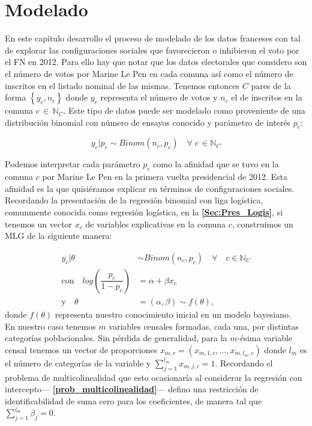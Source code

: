 \chapter{Modelado}

En este capítulo desarrollo el proceso de modelado de los datos franceses con tal de explorar las configuraciones sociales que favorecieron o inhibieron el voto por el FN en 2012. Para ello hay que notar que los datos electorales que considero son el número de votos por Marine Le Pen en cada comuna así como el número de inscritos en el listado nominal de las mismas. Tenemos entonces $C$ pares de la forma $\left\lbrace y_c, n_c \right\rbrace$ donde $y_c$ representa el número de votos y $n_c$ el de inscritos en la comuna $c \,\in\,\mathbb{N}_C$. Este tipo de datos puede ser modelado como proveniente de una distribución binomial con número de ensayos conocido y parámetro de interés $p_c$: 

\begin{equation*}
y_c|p_c \sim Binom(n_c, p_c) \quad \forall \; c \, \in \mathbb{N}_C
\end{equation*} 

Podemos interpretar cada parámetro $p_c$ como la afinidad que se tuvo en la comuna $c$ por Marine Le Pen en la primera vuelta presidencial de 2012. Esta afinidad es la que quisiéramos explicar en términos de configuraciones sociales.\\

Recordando la presentación de la regresión binomial con liga logística, comunmente conocida como regresión logística, en la \textbf{\autoref{Sec:Pres_Logis}}, si tenemos un vector $x_c$ de variables explicativas en la comuna $c$, construimos un MLG de la siguiente manera: 

\begin{align*}
y_c|\theta & \sim Binom(n_c,p_c) \quad \forall \quad c \in \mathbb{N}_C \\
\text{con} \quad log\left(\dfrac{p_c}{1-p_c}\right) &= \alpha + \beta x_c \nonumber \\
\text{y} \quad \theta &= (\alpha,\beta) \sim f(\theta),
\end{align*}
donde $f(\theta)$ representa nuestro conocimiento inicial en un modelo bayesiano.\\ 

En nuestro caso tenemos $m$ variables censales formadas, cada una, por distintas categorías poblacionales. Sin pérdida de generalidad, para la $m$-ésima variable censal tenemos un vector de proporciones $x_{m,c}=(x_{m,1,c},\dots,x_{m,l_m,c})$ donde $l_m$ es el número de categorías de la variable y $\sum\limits_{j=1}^{l_m} x_{m,j,c}=1$. Recordando el problema de multicolinealidad que esto ocasionaría al considerar la regresión con intercepto--- \textbf{\autoref{prob_multicolinealidad}}--- defino una restricción de identificabilidad de suma cero para los coeficientes, de manera tal que $\sum\limits_{j=1}^{l_m}\beta_j=0$.\\

